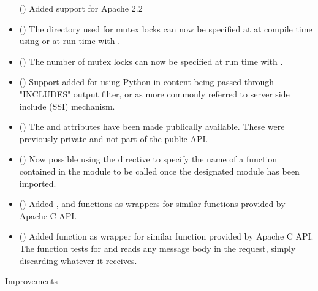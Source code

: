 \begin{itemize}
      ()
      Added support for Apache 2.2
    \item
      ()
      The directory used for mutex locks can now be specified at 
      at compile time using 
      or at run time with .
    \item
      ()
      The number of mutex locks can now be specified at run time with
      .
    \item
      ()
      Support added for using Python in content being passed through "INCLUDES"
      output filter, or as more commonly referred to server side include (SSI)
      mechanism.
    \item
      ()
      The  and  attributes
      have been made publically available. These were previously private and
      not part of the public API.
    \item
      ()
      Now possible using the  directive to specify the name
      of a function contained in the module to be called once the designated
      module has been imported.
    \item
      ()
      Added ,  and
       functions as wrappers for similar functions
      provided by Apache C API.
    \item
      ()
      Added  function as wrapper for
      similar function provided by Apache C API. The function tests for
      and reads any message body in the request, simply discarding
      whatever it receives.
  \end{itemize}

  Improvements

